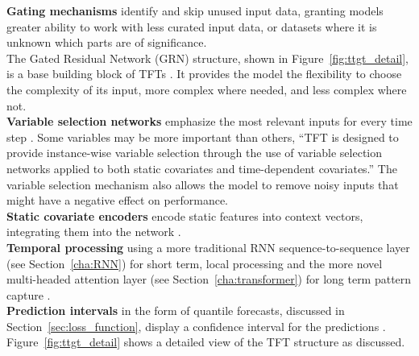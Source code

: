     
    \noindent\textbf{Gating mechanisms} identify and skip unused input data, granting models greater ability to work with less curated input data, or datasets where it is unknown which parts are of significance.\\
    The Gated Residual Network (GRN) structure, shown in Figure~\ref{fig:ttgt_detail}, is a base building block of TFTs \cite{lim_temporal_2020}. It provides the model the flexibility to choose the complexity of its input, more complex where needed, and less complex where not.\\
    \textbf{Variable selection networks} emphasize the most relevant inputs for every time step \cite{lim_temporal_2020}. Some variables may be more important than others, \enquote{TFT is designed to provide instance-wise variable selection through the use of variable selection networks applied to both static covariates and time-dependent covariates.} \cite{lim_temporal_2020} The variable selection mechanism also allows the model to remove noisy inputs that might have a negative effect on performance. \\
    \textbf{Static covariate encoders} encode static features into context vectors, integrating them into the network \cite{lim_temporal_2020}.  \\
    \textbf{Temporal processing} using a more traditional RNN sequence-to-sequence layer (see Section~\ref{cha:RNN}) for short term, local processing and the more novel multi-headed attention layer (see Section~\ref{cha:transformer}) for long term pattern capture \cite{lim_temporal_2020}.\\
    \textbf{Prediction intervals} in the form of quantile forecasts, discussed in Section~\ref{sec:loss_function}, display a confidence interval for the predictions \cite{lim_temporal_2020}. \\
    Figure~\ref{fig:ttgt_detail} shows a detailed view of the TFT structure as discussed. 
    

